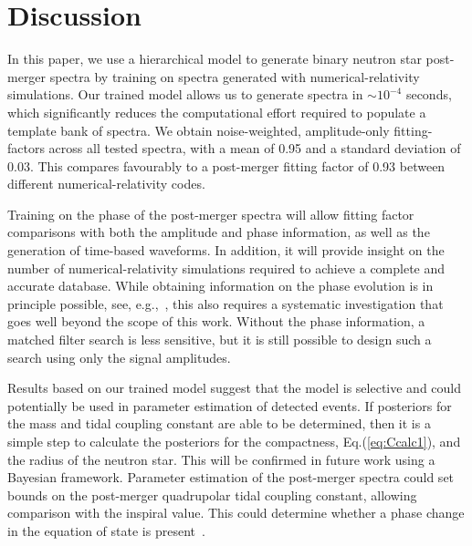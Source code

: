 \documentclass[../Thesis.tex]{subfiles}
\begin{document}
    \section{Discussion}
        In this paper, we use a hierarchical model to generate binary neutron star  post-merger spectra by training on spectra generated with numerical-relativity simulations. Our trained model allows us to generate spectra in ${\sim}10^{-4}$ seconds, which significantly reduces the computational effort required to populate a template bank of spectra. We obtain noise-weighted, amplitude-only fitting-factors across all tested spectra, with a mean of 0.95 and a standard deviation of 0.03. This compares favourably to a post-merger fitting factor of 0.93 between different numerical-relativity codes.\par
        Training on the phase of the post-merger spectra will allow fitting factor comparisons with both the amplitude and phase information, as well as the generation of time-based waveforms. In addition, it will provide insight on the number of numerical-relativity simulations required to achieve a complete and accurate database. While obtaining information on the phase evolution is in principle possible, see, e.g.,~\cite{Bose2018}, this also requires a systematic investigation that goes well beyond the scope of this work. Without the phase information, a matched filter search is less sensitive, but it is still possible to design such a search using only the signal amplitudes.
        \par
        Results based on our trained model suggest that the model is selective and could potentially be used in parameter estimation of detected events. If posteriors for the mass and tidal coupling constant are able to be determined, then it is a simple step to calculate the posteriors for the compactness, Eq.(\ref{eq:Ccalc1}), and the radius of the neutron star. This will be confirmed in future work using a Bayesian framework. Parameter estimation of the post-merger spectra could set bounds on the post-merger quadrupolar tidal coupling constant, allowing comparison with the inspiral value. This could determine whether a phase change in the equation of state is present~\cite{Bauswein2019,Most2018b}.\par
\end{document}
